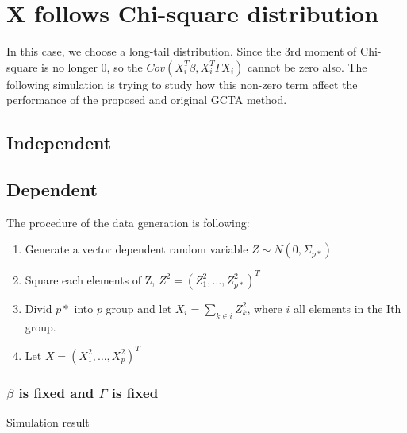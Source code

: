 \documentclass[]{article}
\providecommand{\tightlist}{%
  \setlength{\itemsep}{0pt}\setlength{\parskip}{0pt}}
\begin{document}
\newpage

\section{X follows Chi-square
distribution}\label{x-follows-chi-square-distribution}

In this case, we choose a long-tail distribution. Since the 3rd moment
of Chi-square is no longer 0, so the
\(Cov(X_i^T\beta, X_i^T\Gamma X_i)\) cannot be zero also. The following
simulation is trying to study how this non-zero term affect the
performance of the proposed and original GCTA method.

\subsection{Independent}\label{independent-1}

\subsection{Dependent}\label{dependent}

The procedure of the data generation is following:

\begin{enumerate}
\def\labelenumi{\arabic{enumi}.}
\tightlist
\item
  Generate a vector dependent random variable
  \(Z \sim N(0, \Sigma_{p*})\)
\item
  Square each elements of Z, \(Z^2 = (Z_1^2, \dots, Z_{p*}^2)^T\)
\item
  Divid \(p*\) into \(p\) group and let \(X_i = \sum_{k\in i} Z_{k}^2\),
  where \(i\) all elements in the Ith group.
\item
  Let \(X = (X_1^2, \dots, X_{p}^2)^T\)
\end{enumerate}

\newpage

\subsubsection{\texorpdfstring{\(\beta\) is fixed and \(\Gamma\) is
fixed}{\textbackslash{}beta is fixed and \textbackslash{}Gamma is fixed}}\label{beta-is-fixed-and-gamma-is-fixed-1}

Simulation result
\end{document}
